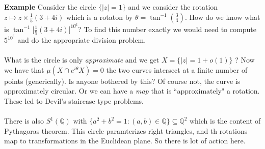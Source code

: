 \documentclass[12pt]{article}
\begin{document}
{{\color{blue}\textbf{Example}} Consider the circle $\{ |z| =1 \}$ and we consider the rotation $z \mapsto z \times \frac{1}{5}(3 + 4i)$ which is a rotaton by $\theta = \tan^{-1} (\frac{3}{4})$.  How do we know what is $\tan^{-1} \big[ \frac{1}{5}(3+4i) \big]^{10^6}$?  To find this number exactly we would need to compute $5^{10^6}$ and do the appropriate division problem.  \\ \\
What is the circle is only \textit{approximate}  and we get $X = \{ |z| = 1 + o(1) \}$ ? Now we have that $  \mu( X \cap e^{i\theta} X) = 0 $ the two curves intersect at a finite number of points (generically). Is anyone bothered by this?  Of course not, the curve is approximately circular.  Or we can have a \textit{map} that is ``approximately" a rotation.  These led to Devil's staircase type problems. \\ \\
There is also $S^1(\mathbb{Q})$ with $\{ a^2 + b^2 = 1: (a,b) \in \mathbb{Q}\} \subseteq \mathbb{Q}^2$ which is the content of Pythagoras theorem.  This circle paramterizes right triangles, and th rotations map to transformations in the Euclidean plane.  So there is lot of action here.  \newpage

}
\end{document}
